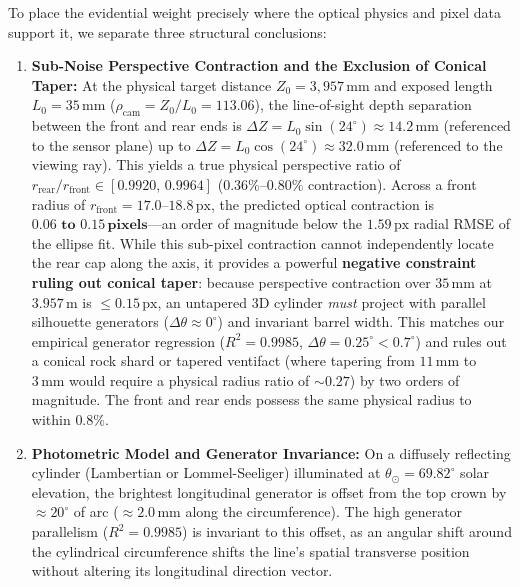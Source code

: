 \documentclass[11pt,a4paper]{article}
\begin{document}
To place the evidential weight precisely where the optical physics and pixel data support it, we separate three structural conclusions:
\begin{enumerate}
	\item \textbf{Sub-Noise Perspective Contraction and the Exclusion of Conical Taper:} At the physical target distance $Z_0 = 3{,}957\,\text{mm}$ and exposed length $L_0 = 35\,\text{mm}$ ($\rho_{\text{cam}} = Z_0 / L_0 = 113.06$), the line-of-sight depth separation between the front and rear ends is $\Delta Z = L_0 \sin(24^\circ) \approx 14.2\,\text{mm}$ (referenced to the sensor plane) up to $\Delta Z = L_0 \cos(24^\circ) \approx 32.0\,\text{mm}$ (referenced to the viewing ray). This yields a true physical perspective ratio of $r_{\text{rear}}/r_{\text{front}} \in [0.9920,\, 0.9964]$ ($0.36\%\text{--}0.80\%$ contraction). Across a front radius of $r_{\text{front}} = 17.0\text{--}18.8\,\text{px}$, the predicted optical contraction is $\mathbf{0.06\text{ to }0.15\,\text{pixels}}$---an order of magnitude below the $1.59\,\text{px}$ radial RMSE of the ellipse fit. While this sub-pixel contraction cannot independently locate the rear cap along the axis, it provides a powerful \textbf{negative constraint ruling out conical taper}: because perspective contraction over $35\,\text{mm}$ at $3.957\,\text{m}$ is $\le 0.15\,\text{px}$, an untapered 3D cylinder \textit{must} project with parallel silhouette generators ($\Delta\theta \approx 0^\circ$) and invariant barrel width. This matches our empirical generator regression ($R^2 = 0.9985$, $\Delta\theta = 0.25^\circ < 0.7^\circ$) and rules out a conical rock shard or tapered ventifact (where tapering from $11\,\text{mm}$ to $3\,\text{mm}$ would require a physical radius ratio of $\sim 0.27$) by two orders of magnitude. The front and rear ends possess the same physical radius to within $0.8\%$.
	\item \textbf{Photometric Model and Generator Invariance:} On a diffusely reflecting cylinder (Lambertian or Lommel-Seeliger) illuminated at $\theta_\odot = 69.82^\circ$ solar elevation, the brightest longitudinal generator is offset from the top crown by $\approx 20^\circ$ of arc ($\approx 2.0\,\text{mm}$ along the circumference). The high generator parallelism ($R^2 = 0.9985$) is invariant to this offset, as an angular shift around the cylindrical circumference shifts the line's spatial transverse position without altering its longitudinal direction vector.

\end{enumerate}
\end{document}
